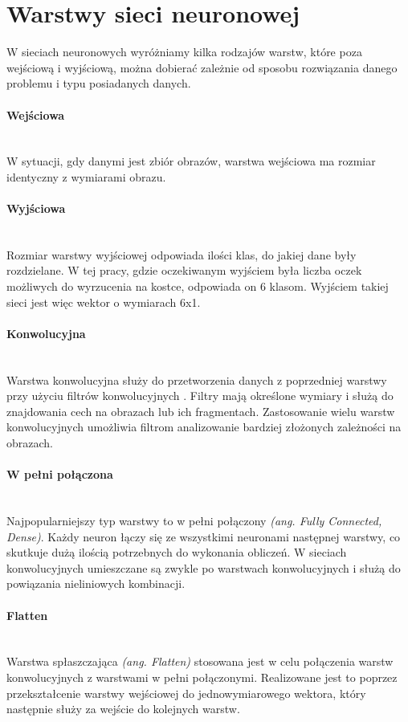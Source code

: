\section{Warstwy sieci neuronowej}

W sieciach neuronowych wyróżniamy kilka rodzajów warstw, które poza wejściową i wyjściową,
można dobierać zależnie od sposobu rozwiązania danego problemu i typu posiadanych danych.

\paragraph{Wejściowa} \mbox{}\\
W sytuacji, gdy danymi jest zbiór obrazów, warstwa wejściowa ma rozmiar identyczny z
wymiarami obrazu.

\paragraph{Wyjściowa} \mbox{}\\
Rozmiar warstwy wyjściowej odpowiada ilości klas, do jakiej dane były rozdzielane.
W tej pracy, gdzie oczekiwanym wyjściem była liczba oczek możliwych do wyrzucenia na
kostce, odpowiada on 6 klasom. Wyjściem takiej sieci jest więc wektor o wymiarach 6x1.

\paragraph{Konwolucyjna} \mbox{}\\
Warstwa konwolucyjna służy do przetworzenia danych z poprzedniej warstwy przy użyciu
filtrów konwolucyjnych \cite{CS231n}. Filtry mają określone wymiary i służą do znajdowania cech
na obrazach lub ich fragmentach. Zastosowanie wielu warstw konwolucyjnych umożliwia filtrom
analizowanie bardziej złożonych zależności na obrazach.

\paragraph{W pełni połączona} \mbox{}\\
Najpopularniejszy typ warstwy to w pełni połączony \textit{(ang. Fully Connected, Dense)}.
Każdy neuron łączy się ze wszystkimi neuronami następnej warstwy, co skutkuje dużą ilością
potrzebnych do wykonania obliczeń.
W sieciach konwolucyjnych umieszczane są zwykle po warstwach konwolucyjnych
i służą do powiązania nieliniowych kombinacji.

\paragraph{Flatten} \mbox{}\\
Warstwa spłaszczająca \textit{(ang. Flatten)} stosowana jest w celu połączenia warstw
konwolucyjnych z warstwami w pełni połączonymi. Realizowane jest to poprzez przekształcenie
warstwy wejściowej do jednowymiarowego wektora, który następnie służy za wejście
do kolejnych warstw.

